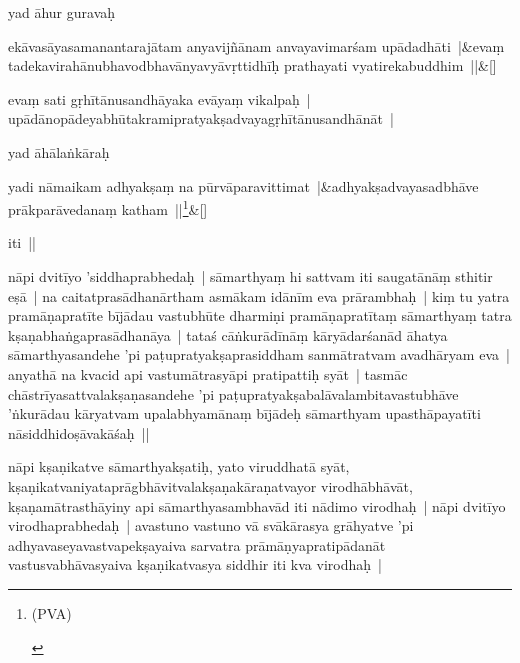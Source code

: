 \documentclass[article,a4paper]{memoir}
\begin{document}
	  \pstart yad ā\-hur guravaḥ 
	\pend
      
	    
	    \stanza[\smallbreak]
ekā\-vasā\-yasamanantarajā\-tam anyavijñā\-nam anvayavimarśam upā\-dadhā\-ti |&evaṃ tadekavirahā\-nubhavodbhavā\-nyavyā\-vṛttidhī\-ḥ prathayati vyatirekabuddhim ||\&[\smallbreak]


	

	  \pstart evaṃ sati gṛhī\-tā\-nusandhā\-yaka evā\-yaṃ vikalpaḥ | upā\-dā\-nopā\-deyabhū\-takramipratyakṣadvayagṛhī\-tā\-nusandhā\-nā\-t | 
	\pend
      

	  \pstart yad ā\-hā\-laṅkā\-raḥ 
	\pend
      
	    
	    \stanza[\smallbreak]
yadi nā\-maikam adhyakṣaṃ na pū\-rvā\-paravittimat |&adhyakṣadvayasadbhā\-ve prā\-kparā\-vedanaṃ katham ||\footnote{\begin{english}(PVA)\end{english}}\&[\smallbreak]


	

	  \pstart iti ||
	\pend
      

	  \pstart nā\-pi dvitī\-yo 'siddhaprabhedaḥ | sā\-marthyaṃ hi sattvam iti saugatā\-nā\-ṃ sthitir eṣā\- | na caitatprasā\-dhanā\-rtham asmā\-kam idā\-nī\-m eva prā\-rambhaḥ | kiṃ tu yatra pramā\-ṇapratī\-te bī\-jā\-dau vastubhū\-te dharmiṇi pramā\-ṇapratī\-taṃ sā\-marthyaṃ tatra kṣaṇabhaṅgaprasā\-dhanā\-ya | \label{thakur75-72.26} tataś cā\-ṅkurā\-dī\-nā\-ṃ kā\-ryā\-darśanā\-d ā\-hatya sā\-marthyasandehe 'pi paṭupratyakṣaprasiddham sanmā\-tratvam avadhā\-ryam eva | anyathā\- na kvacid api vastumā\-trasyā\-pi pratipattiḥ syā\-t | \label{thakur75-72.29} tasmā\-c chā\-strī\-yasattvalakṣaṇasandehe 'pi paṭupratyakṣabalā\-valambitavastubhā\-ve 'ṅkurā\-dau kā\-ryatvam upalabhyamā\-naṃ bī\-jā\-deḥ sā\-marthyam upasthā\-payatī\-ti nā\-siddhidoṣā\-vakā\-śaḥ ||
	\pend
      

	  \pstart nā\-pi kṣaṇikatve sā\-marthyakṣatiḥ, yato viruddhatā\- syā\-t, kṣaṇikatvaniyataprā\-gbhā\-vitvalakṣaṇakā\-raṇatvayor virodhā\-bhā\-vā\-t, kṣaṇamā\-trasthā\-yiny api sā\-marthyasambhavā\-d iti nā\-dimo virodhaḥ | \label{thakur75-73.5} nā\-pi dvitī\-yo virodhaprabhedaḥ | avastuno vastuno vā\- svā\-kā\-rasya grā\-hyatve 'pi adhyavaseyavastvapekṣayaiva sarvatra prā\-mā\-ṇyapratipā\-danā\-t vastusvabhā\-vasyaiva kṣaṇikatvasya siddhir iti kva virodhaḥ |
	\pend
      
\end{document}
